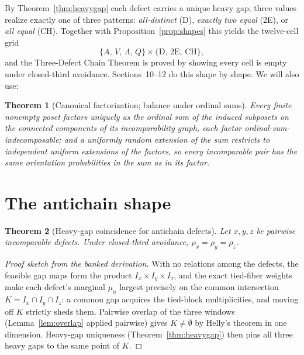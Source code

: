 \documentclass[11pt]{article}
\newtheorem{theorem}{Theorem}[section]
\theoremstyle{definition}
\theoremstyle{remark}
\begin{document}
By Theorem~\ref{thm:heavygap} each defect carries a unique heavy gap; three values
realize exactly one of three patterns: \emph{all-distinct} (D), \emph{exactly two equal}
(2E), or \emph{all equal} (CH). Together with Proposition~\ref{prop:shapes} this yields
the twelve-cell grid
\[
\{A,\,V,\,\Lambda,\,Q\}\times\{\mathrm{D},\,\mathrm{2E},\,\mathrm{CH}\},
\]
and the Three-Defect Chain Theorem is proved by showing every cell is empty under
closed-third avoidance. Sections~10--12 do this shape by shape. We will also use:

\begin{theorem}[Canonical factorization; balance under ordinal sums]\label{thm:factor}
Every finite nonempty poset factors uniquely as the ordinal sum of the induced subposets
on the connected components of its incomparability graph, each factor
ordinal-sum-indecomposable; and a uniformly random extension of the sum restricts to
independent uniform extensions of the factors, so every incomparable pair has the same
orientation probabilities in the sum as in its factor.
\end{theorem}

\section{The antichain shape}\label{sec:antichain}
\begin{theorem}[Heavy-gap coincidence for antichain defects]\label{thm:antichaincoincide}
Let $x,y,z$ be pairwise incomparable defects. Under closed-third avoidance,
$\rho_x=\rho_y=\rho_z$.
\end{theorem}

\begin{proof}[Proof sketch from the banked derivation]
With no relations among the defects, the feasible gap maps form the product
$I_x\times I_y\times I_z$, and the exact tied-fiber weights make each defect's marginal
$\mu_u$ largest precisely on the common intersection $K=I_x\cap I_y\cap I_z$: a common
gap acquires the tied-block multiplicities, and moving off $K$ strictly sheds them.
Pairwise overlap of the three windows (Lemma~\ref{lem:overlap} applied pairwise) gives
$K\neq\emptyset$ by Helly's theorem in one dimension. Heavy-gap uniqueness
(Theorem~\ref{thm:heavygap}) then pins all three heavy gaps to the same point of $K$.
\end{proof}
\end{document}
